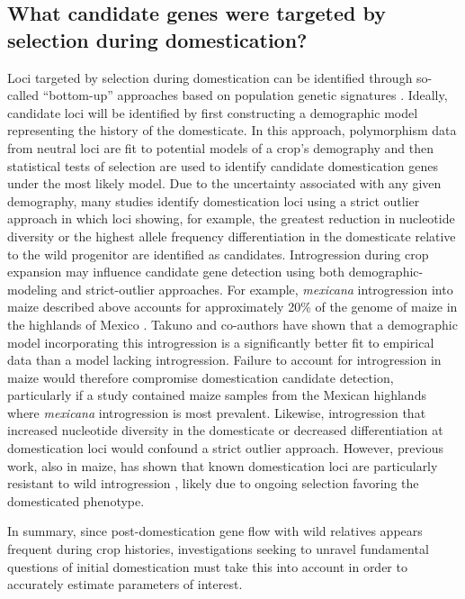 \documentclass[11pt]{article}
\begin{document}
\subsection*{What candidate genes were targeted by selection during domestication?}

Loci targeted by selection during domestication can be identified through so-called ``bottom-up'' approaches based on population genetic signatures \citep{Ross-Ibarra2007}.
Ideally, candidate loci will be identified by first constructing a demographic model representing the history of the domesticate.
In this approach, polymorphism data from neutral loci are fit to potential models of a crop's demography and then statistical tests of selection are used to identify candidate domestication genes under the most likely model.
Due to the uncertainty associated with any given demography, many studies identify domestication loci using a strict outlier approach in which loci showing, for example, the greatest reduction in nucleotide diversity or the highest allele frequency differentiation in the domesticate relative to the wild progenitor are identified as candidates.
Introgression during crop expansion may influence candidate gene detection using both demographic-modeling and strict-outlier approaches.
For example, \emph{mexicana} introgression into maize described above accounts for approximately 20\% of the genome of maize in the highlands of Mexico \citep{vanHeerwaarden2011}.
Takuno and co-authors \citeyearpar{Takuno2015} have shown that a demographic model incorporating this introgression is a significantly better fit to empirical data than a model lacking introgression.
Failure to account for introgression in maize would therefore compromise domestication candidate detection, particularly if a study contained maize samples from the Mexican highlands where \emph{mexicana} introgression is most prevalent.
Likewise, introgression that increased nucleotide diversity in the domesticate or decreased differentiation at domestication loci would confound a strict outlier approach.
However, previous work, also in maize, has shown that known domestication loci are particularly resistant to wild introgression \citep{Hufford2013}, likely due to ongoing selection favoring the domesticated phenotype.
\vspace{5mm}

In summary, since post-domestication gene flow with wild relatives appears frequent during crop histories, investigations seeking to unravel fundamental questions of initial domestication must take this into account in order to accurately estimate parameters of interest.
\end{document}
